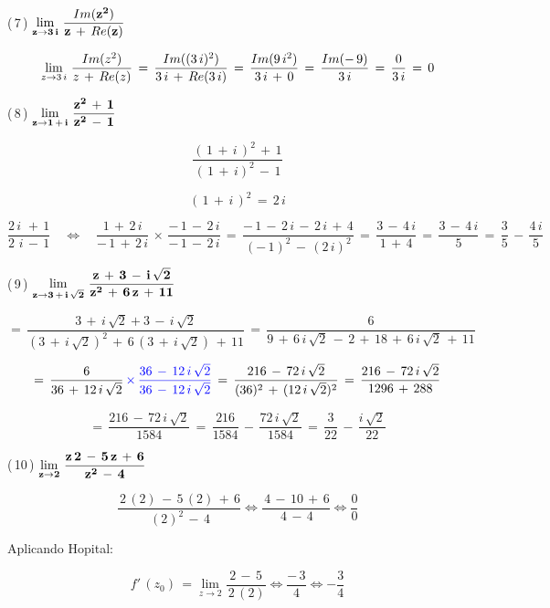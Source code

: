 \documentclass[a4paper,11pt,openany]{book}
\begin{document}
\textcolor{ao(english)}{(\,7\,)} $\bf{\displaystyle\lim_{z \to 3\,i}\,\dfrac{\mathnormal{Im}(z^{2})}{z\,+\,\mathnormal{Re}(z)}}$

$$\displaystyle\lim_{z \to 3\,i}\,\dfrac{\mathnormal{Im}(z^{2})}{z\,+\,\mathnormal{Re}(z)}\,=\,\dfrac{\mathnormal{Im}((3\,i)^{2})}{3\,i\,+\,\mathnormal{Re}(3\,i)}\,=\,\dfrac{\mathnormal{Im}(9\,i^{2})}{3\,i\,+\,0}\,=\,\dfrac{\mathnormal{Im}(-\,9)}{3\,i}\,=\,\dfrac{0}{3\,i}\,=\,0$$

\textcolor{ao(english)}{(\,8\,)} $\bf{\displaystyle\lim_{z \to 1\,+\,i}\,\dfrac{z^{2}\,+\,1}{z^{2}\,-\,1}}$

$$\dfrac{(\,1\,+\,i\,)^{2}\,+\,1}{(\,1\,+\,i)^{2}\,-\,1}$$

$$(\,1\,+\,i\,)^{2}\,=\,2\,i$$

$$\dfrac{2\,i\,\,+\,1}{2\,\,i\,-\,1} \quad\iff\quad \dfrac{1\,+\,2\,i}{-\,1\,+\,2\,i}\,\times\,\dfrac{-\,1\,-\,2\,i}{-\,1\,-\,2\,i}\,=\,\dfrac{-\,1\,-\,2\,i\,-\,2\,i\,+\,4}{(-\,1)^{2}\,-\,(2\,i)^{2}}\,=\,\dfrac{3\,-\,4\,i}{1\,+\,4}\,=\,\dfrac{3\,-\,4\,i}{5}\,=\,\boxed{\dfrac{3}{5}\,-\,\dfrac{4\,i}{5}}$$

\textcolor{ao(english)}{(\,9\,)} $\bf{\displaystyle\lim_{z \to 3\,+\,i\,\sqrt{2}}\,\dfrac{z\,+\,3\,-\,i\,\sqrt{2}}{z^{2}\,+\,6\,z\,+\,11}}$

$$=\,\dfrac{3\,+\,i\,\sqrt{2}+3\,-\,i\,\sqrt{2}}{(3\,+\,i\,\sqrt{2})^{2}\,+\,6\,(3\,+\,i\,\sqrt{2})\,+\,11}\,=\,\dfrac{6}{9\,+\,6\,i\,\sqrt{2}\,-\,2\,+\,18\,+\,6\,i\,\sqrt{2}\,+\,11}$$

$$=\,\dfrac{6}{36\,+\,12\,i\,\sqrt{2}}\,\textcolor{ao}{\times\,\dfrac{36\,-\,12\,i\,\sqrt{2}}{36\,-\,12\,i\,\sqrt{2}}}\,=\,\dfrac{216\,-\,72\,i\,\sqrt{2}}{(36)^{2}\,+\,(12\,i\,\sqrt{2})^{2}}\,=\,\dfrac{216\,-\,72\,i\,\sqrt{2}}{1296\,+\,288}$$

$$=\,\dfrac{216\,-\,72\,i\,\sqrt{2}}{1584}\,=\,\dfrac{216}{1584}\,-\,\dfrac{72\,i\,\sqrt{2}}{1584}\,=\,\dfrac{3}{22}\,-\,\dfrac{i\,\sqrt{2}}{22}$$

\textcolor{ao(english)}{(\,10\,)} $\bf{\displaystyle\lim_{z \to 2}\,\dfrac{z\,2\,-\,5\,z\,+\,6}{z^{2}\,-\,4}}$

$$ \dfrac{\,2\,(2)\,-\,5\,(2)\,+\,6}{\,(2)^{2}\,-\,4} \iff \dfrac{\,4\,-\,10\,+\,6}{\,4\,-\,4} \iff \dfrac{0}{0}$$

\newpage

Aplicando Hopital:

$$ f'\,(z_{0})\,= \displaystyle\lim_{z \to 2} \dfrac{\,2\,-\,5\,}{\,2\,(2)} \iff \dfrac{-\,3}{4} \iff \boxed{-\dfrac{3}{4}}$$
\end{document}
